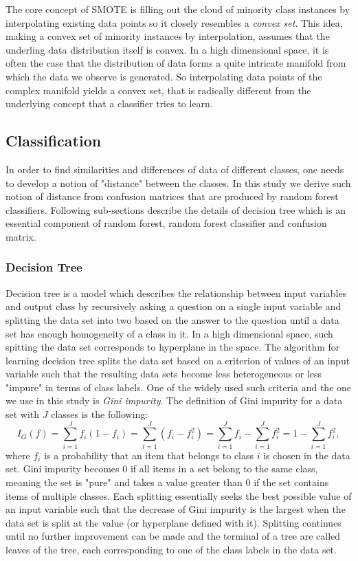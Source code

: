 \documentclass{article}
\begin{document}
The core concept of SMOTE is filling out the cloud of minority class instances by interpolating existing data points so it closely resembles a \textit{convex set}. This idea, making a convex set of minority instances by interpolation, assumes that the underling data distribution itself is convex. In a high dimensional space, it is often the case that the distribution of data forms a quite intricate manifold from which the data we observe is generated. So interpolating data points of the complex manifold yields a convex set, that is radically different from the underlying concept that a classifier tries to learn.

	\subsection{Classification}
	In order to find similarities and differences of data of different classes, one needs to develop a notion of "distance" between the classes. In this study we derive such notion of distance from confusion matrices that are produced by random forest classifiers. Following sub-sections describe the details of decision tree which is an essential component of random forest, random forest classifier and confusion matrix.
	
		\subsubsection{Decision Tree}
		Decision tree is a model which describes the relationship between input variables and output class by recursively asking a question on a single input variable and splitting the data set into two based on the answer to the question until a data set has enough homogeneity of a class in it. In a high dimensional space, such spitting the data set corresponds to hyperplane in the space. The algorithm for learning decision tree splits the data set based on a criterion of values of an input variable such that the resulting data sets become less heterogeneous or less "impure" in terms of class labels. One of the widely used such criteria and the one we use in this study is \textit{Gini impurity}. The definition of Gini impurity for a data set with $J$ classes is the following:
	\begin{equation}
	I_G(f) = \sum_{i=1}^J f_i(1-f_i) = \sum_{i=1}^J (f_i-f_i^2) =  \sum_{i=1}^J f_i - \sum_{i=1}^J f_i^2 = 1- \sum_{i=1}^J f_i^2,
	\end{equation}
where $f_i$ is a probability that an item that belongs to class $i$ is chosen in the data set. Gini impurity becomes $0$ if all items in a set belong to the same class, meaning the set is "pure" and takes a value greater than $0$ if the set contains items of multiple classes. Each splitting essentially seeks the best possible value of an input variable such that the decrease of Gini impurity is the largest when the data set is split at the value (or hyperplane defined with it). Splitting continues until no further improvement can be made and the terminal of a tree are called leaves of the tree, each corresponding to one of the class labels in the data set.
		
\end{document}
